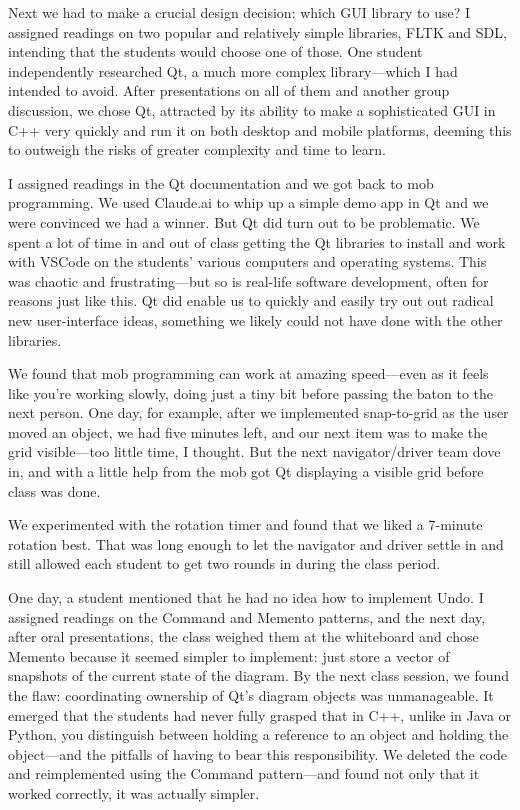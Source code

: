 \documentclass{article}
\begin{document}
Next we had to make a crucial design decision: which GUI library to use?
I assigned readings on two popular and relatively simple libraries, FLTK and
SDL, intending that the students would choose one of those. One student
independently researched Qt, a much more complex library---which I had
intended to avoid. After presentations on all of them and another group
discussion, we chose Qt, attracted by its ability to make a sophisticated
GUI in C++ very quickly and run it on both desktop and mobile platforms,
deeming this to outweigh the risks of greater complexity and time to learn.

I assigned readings in the Qt documentation and we got back to mob
programming. We used Claude.ai to whip up a simple demo app in Qt and we were
convinced we had a winner. But Qt did turn out to be problematic. We spent a
lot of time in and out of class getting the Qt libraries to install
and work with VSCode on the students' various computers and operating systems.
This was chaotic and frustrating---but so is real-life software development,
often for reasons just like this. Qt did enable us to quickly and easily try
out out radical new user-interface ideas, something we likely could not have
done with the other libraries.

We found that mob programming can work at amazing speed---even as it feels
like you're working slowly, doing just a tiny bit before passing the baton to
the next person.  One day, for example, after we implemented snap-to-grid as
the user moved an object, we had five minutes left, and our next item was to
make the grid visible---too little time, I thought. But the next
navigator/driver team dove in, and with a little help from the mob got Qt
displaying a visible grid before class was done.

We experimented with the rotation timer and found that we liked a 7-minute
rotation best. That was long enough to let the navigator and driver settle in
and still allowed each student to get two rounds in during the class period.



One day, a student mentioned that he had no idea how to implement Undo.
I assigned readings on the Command and Memento patterns, and the next day,
after oral presentations, the class weighed them at the whiteboard and chose
Memento because it seemed simpler to implement: just store a
vector of snapshots of the current state of the diagram. By the next class
session, we found the flaw: coordinating ownership of Qt's diagram objects was
unmanageable. It emerged that the students had never fully grasped that in
C++, unlike in Java or Python, you distinguish between holding a reference to
an object and holding the object---and the pitfalls of having to bear this
responsibility. We deleted the code and reimplemented using the Command
pattern---and found not only that it worked correctly, it was actually simpler.
\end{document}
